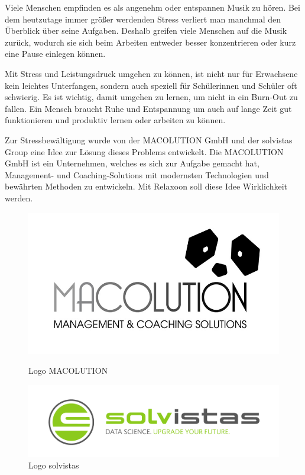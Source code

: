 
Viele Menschen empfinden es als angenehm oder entspannen Musik zu hören. Bei dem heutzutage immer größer
werdenden Stress verliert man manchmal den Überblick über seine Aufgaben. Deshalb greifen viele Menschen
auf die Musik zurück, wodurch sie sich beim Arbeiten entweder besser konzentrieren oder kurz
eine Pause einlegen können.

Mit Stress und Leistungsdruck umgehen zu können, ist nicht nur für Erwachsene kein leichtes Unterfangen,
sondern auch speziell für Schülerinnen und Schüler oft schwierig. Es ist wichtig, damit umgehen zu lernen,
um nicht in ein Burn-Out zu fallen. Ein Mensch braucht Ruhe und Entspannung um auch auf lange Zeit gut
funktionieren und produktiv lernen oder arbeiten zu können.

Zur Stressbewältigung wurde von der MACOLUTION GmbH und der solvistas Group eine Idee zur Lösung dieses
Problems entwickelt. Die MACOLUTION GmbH ist ein Unternehmen, welches es sich zur Aufgabe gemacht hat,
Management- und Coaching-Solutions mit modernsten Technologien und bewährten Methoden zu entwickeln.
\cite{MACOLUTION}
Mit Relaxoon soll diese Idee Wirklichkeit werden.

\begin{figure}[H]
    \hspace{-2cm}
    \begin{minipage}{0.5\textwidth}
        \centering
        \includegraphics[height=0.4\textwidth]{./pics/Logo-Macolution.jpg}
        \caption{Logo MACOLUTION}
    \end{minipage}
    \begin{minipage}{0.5\textwidth}
        \centering
        \includegraphics[height=0.4\textwidth]{./pics/Logo-Solvistas.jpg}
        \caption{Logo solvistas}
    \end{minipage}
\end{figure}
